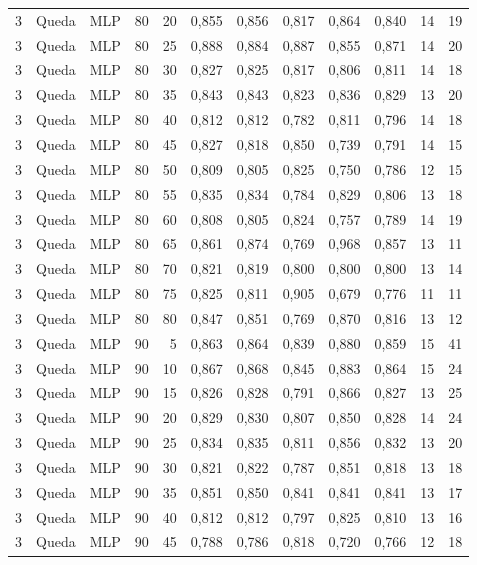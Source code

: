 \begin{longtable}{@{}rllrrrrrrrrr@{}}
3 & Queda & MLP & 80 & 20 & 0,855 & 0,856 & 0,817 & 0,864 & 0,840 & 14 & 19 \\
3 & Queda & MLP & 80 & 25 & 0,888 & 0,884 & 0,887 & 0,855 & 0,871 & 14 & 20 \\
3 & Queda & MLP & 80 & 30 & 0,827 & 0,825 & 0,817 & 0,806 & 0,811 & 14 & 18 \\
3 & Queda & MLP & 80 & 35 & 0,843 & 0,843 & 0,823 & 0,836 & 0,829 & 13 & 20 \\
3 & Queda & MLP & 80 & 40 & 0,812 & 0,812 & 0,782 & 0,811 & 0,796 & 14 & 18 \\
3 & Queda & MLP & 80 & 45 & 0,827 & 0,818 & 0,850 & 0,739 & 0,791 & 14 & 15 \\
3 & Queda & MLP & 80 & 50 & 0,809 & 0,805 & 0,825 & 0,750 & 0,786 & 12 & 15 \\
3 & Queda & MLP & 80 & 55 & 0,835 & 0,834 & 0,784 & 0,829 & 0,806 & 13 & 18 \\
3 & Queda & MLP & 80 & 60 & 0,808 & 0,805 & 0,824 & 0,757 & 0,789 & 14 & 19 \\
3 & Queda & MLP & 80 & 65 & 0,861 & 0,874 & 0,769 & 0,968 & 0,857 & 13 & 11 \\
3 & Queda & MLP & 80 & 70 & 0,821 & 0,819 & 0,800 & 0,800 & 0,800 & 13 & 14 \\
3 & Queda & MLP & 80 & 75 & 0,825 & 0,811 & 0,905 & 0,679 & 0,776 & 11 & 11 \\
3 & Queda & MLP & 80 & 80 & 0,847 & 0,851 & 0,769 & 0,870 & 0,816 & 13 & 12 \\
3 & Queda & MLP & 90 & 5 & 0,863 & 0,864 & 0,839 & 0,880 & 0,859 & 15 & 41 \\
3 & Queda & MLP & 90 & 10 & 0,867 & 0,868 & 0,845 & 0,883 & 0,864 & 15 & 24 \\
3 & Queda & MLP & 90 & 15 & 0,826 & 0,828 & 0,791 & 0,866 & 0,827 & 13 & 25 \\
3 & Queda & MLP & 90 & 20 & 0,829 & 0,830 & 0,807 & 0,850 & 0,828 & 14 & 24 \\
3 & Queda & MLP & 90 & 25 & 0,834 & 0,835 & 0,811 & 0,856 & 0,832 & 13 & 20 \\
3 & Queda & MLP & 90 & 30 & 0,821 & 0,822 & 0,787 & 0,851 & 0,818 & 13 & 18 \\
3 & Queda & MLP & 90 & 35 & 0,851 & 0,850 & 0,841 & 0,841 & 0,841 & 13 & 17 \\
3 & Queda & MLP & 90 & 40 & 0,812 & 0,812 & 0,797 & 0,825 & 0,810 & 13 & 16 \\
3 & Queda & MLP & 90 & 45 & 0,788 & 0,786 & 0,818 & 0,720 & 0,766 & 12 & 18 \\

\end{longtable}
